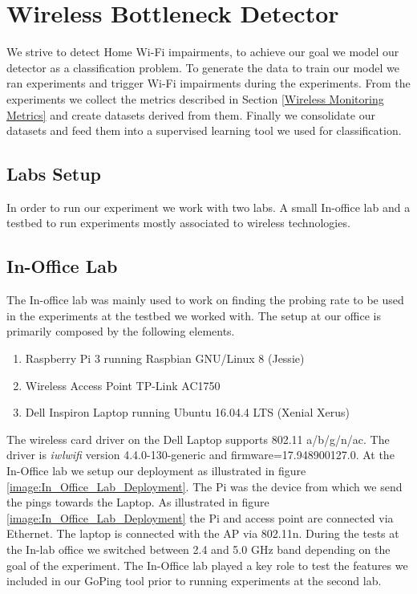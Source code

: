 \section{Wireless Bottleneck Detector}\label{Wireless Bottleneck Detector}

We strive to detect Home Wi-Fi impairments, to achieve our goal we model our detector as a classification problem. To generate the data to train our model we ran experiments and trigger Wi-Fi impairments during the experiments. From the experiments we collect the metrics described in Section \ref{Wireless Monitoring Metrics} and create datasets derived from them. Finally we consolidate our datasets and feed them into a supervised learning tool we used for classification.

\subsection{Labs Setup}\label{labs_setup}

In order to run our experiment we work with two labs. A small In-office lab and a testbed to run experiments mostly associated to wireless technologies.

\subsection*{In-Office Lab}

The In-office lab was mainly used to work on finding the probing rate to be used in the experiments at the testbed we worked with. The setup at our office is primarily composed by the following elements.

\begin{enumerate}
	\item Raspberry Pi 3 running Raspbian GNU/Linux 8 (Jessie)
	\item Wireless Access Point TP-Link AC1750
	\item Dell Inspiron Laptop running Ubuntu 16.04.4 LTS (Xenial Xerus)
\end{enumerate}
	
	The wireless card driver on the Dell Laptop supports 802.11 a/b/g/n/ac. The driver is \textit{iwlwifi} version 4.4.0-130-generic and firmware=17.948900127.0. At the In-Office lab we setup our deployment as illustrated in figure \ref{image:In_Office_Lab_Deployment}. The Pi was the device from which we send the pings towards the Laptop. As illustrated in figure \ref{image:In_Office_Lab_Deployment} the Pi and access point are connected via Ethernet. The laptop is connected with the AP via 802.11n. During the tests at the In-lab office we switched between 2.4 and 5.0 GHz band depending on the goal of the experiment. The In-Office lab played a key role to test the features we included in our GoPing tool prior to running experiments at the second lab.
	
